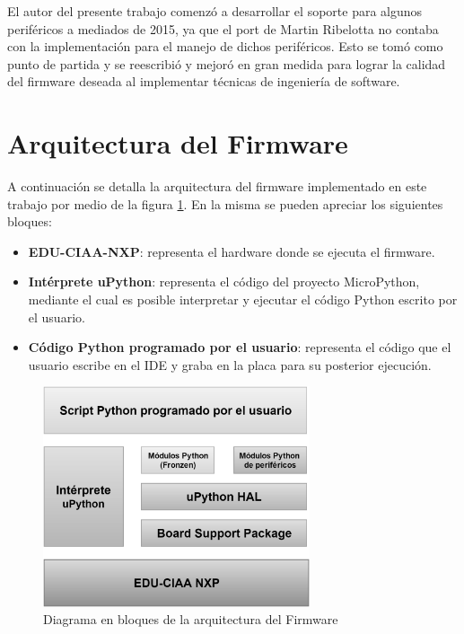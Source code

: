 
El autor del presente trabajo comenzó a desarrollar el soporte para algunos periféricos a mediados de 2015, ya que el port de Martin Ribelotta no contaba con la implementación para el manejo de dichos periféricos. Esto se tomó como punto de partida y se reescribió y mejoró en gran medida para lograr la calidad del firmware deseada al implementar técnicas de ingeniería de software.

\section{Arquitectura del Firmware}
\label{sec:firmwareArq}

A continuación se detalla la arquitectura del firmware implementado en este trabajo por medio de la figura \ref{fig:firmwareArq}. En la misma se pueden apreciar los siguientes bloques:

\begin{itemize}
	\item \textbf{EDU-CIAA-NXP}: representa el hardware donde se ejecuta el firmware.
	\item \textbf{Intérprete uPython}: representa el código del proyecto MicroPython, mediante el cual es posible interpretar y ejecutar el código Python escrito por el usuario.
	\item \textbf{Código Python programado por el usuario}: representa el código que el usuario escribe en el IDE y graba en la placa para su posterior ejecución.
\end{itemize}

\begin{figure}[ht]
  \centering
    \includegraphics[width=0.7\textwidth]{Figures/fig_firm_arquitectura}
  \caption{Diagrama en bloques de la arquitectura del Firmware}
  \label{fig:firmwareArq}
\end{figure}

